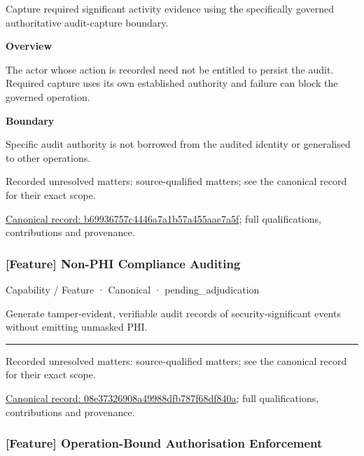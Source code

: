 Capture required significant activity evidence using the specifically governed authoritative audit-capture boundary.



\textbf{Overview}



The actor whose action is recorded need not be entitled to persist the audit. Required capture uses its own established authority and failure can block the governed operation.



\textbf{Boundary}



Specific audit authority is not borrowed from the audited identity or generalised to other operations.


{\small Recorded unresolved matters: source-qualified matters; see the canonical record for their exact scope.}\par
{\footnotesize \href{../../../../continuum/strategy/capability/feature/b69936757c4446a7a1b57a455aae7a5f.md}{Canonical record: b69936757c4446a7a1b57a455aae7a5f}; full qualifications, contributions and provenance.}\par
\subsubsection{[Feature] Non-PHI Compliance Auditing}

\label{element:08e37326908a49988dfb787f68df840a}
{\small Capability / Feature · Canonical · pending\_adjudication}\par

Generate tamper-evident, verifiable audit records of security-significant events without emitting unmasked PHI.



\medskip\hrule\medskip

{\small Recorded unresolved matters: source-qualified matters; see the canonical record for their exact scope.}\par
{\footnotesize \href{../../../../continuum/strategy/capability/feature/08e37326908a49988dfb787f68df840a.md}{Canonical record: 08e37326908a49988dfb787f68df840a}; full qualifications, contributions and provenance.}\par
\subsubsection{[Feature] Operation-Bound Authorisation Enforcement}

